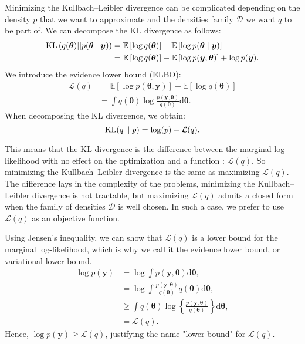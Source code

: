 \documentclass{article}
\numberwithin{equation}{section}
\DeclareMathOperator*{\KL}{{\rm KL}}
\begin{document}
Minimizing the Kullbach--Leibler divergence can be complicated depending on the density $p$ that we want to approximate and the densities family $\mathcal{D}$ we want $q$ to be part of. We can decompose the KL divergence as follows:
\begin{align*}
\KL\left(q(\boldsymbol{\theta})||p(\boldsymbol{\theta}\mid \boldsymbol{y})\right) &= \mathbb{E}\left[\log q(\boldsymbol{\theta})\right] - \mathbb{E}\left[\log p(\boldsymbol{\theta}\mid \boldsymbol{y})\right]\\
&= \mathbb{E}\left[\log q(\boldsymbol{\theta})\right] - \mathbb{E}\left[\log p(\boldsymbol{y},\boldsymbol{\theta})\right] + \log p(\boldsymbol{y}).
\end{align*}
We introduce the evidence lower bound (\small{ELBO}):
\begin{align*}
\mathcal{L}(q) &= \mathbb{E}\left[\log p(\boldsymbol{\theta},\boldsymbol{y})\right] - \mathbb{E}\left[\log q(\boldsymbol{\theta})\right]\\
&=\int q(\boldsymbol{\theta})\log\frac{p(\boldsymbol{y},\boldsymbol{\theta})}{q(\boldsymbol{\theta})}\mathrm{d}\boldsymbol{\theta}.
\end{align*}
When decomposing the KL divergence, we obtain:
\begin{equation*}
\KL(q\parallel p) = \log(p) - \mathcal{L}(q).
\end{equation*}

This means that the KL divergence is the difference between the marginal log-likelihood with no effect on the optimization and a function : $\mathcal{L}(q)$. So minimizing the Kullbach--Leibler divergence is the same as maximizing $\mathcal{L}(q)$. The difference lays in the complexity of the problems, minimizing the Kullbach--Leibler divergence is not tractable, but maximizing $\mathcal{L}(q)$ admits a closed form when the family of densities $\mathcal{D}$ is well chosen. In such a case, we prefer to use $\mathcal{L}(q)$ as an objective function.

Using Jensen's inequality, we can show that $\mathcal{L}(q)$ is a lower bound for the marginal log-likelihood, which is why we call it the evidence lower bound, or variational lower bound.
\begin{align*}
\log p(\boldsymbol{y}) &= \log \int p(\boldsymbol{y}, \boldsymbol{\theta}) \mathrm{d}\boldsymbol{\theta},\\
&= \log \int \frac{p(\boldsymbol{y}, \boldsymbol{\theta})}{q(\boldsymbol{\theta})}q(\boldsymbol{\theta})\mathrm{d}\boldsymbol{\theta}
,\\
&\geq \int q(\boldsymbol{\theta}) \log \left\lbrace \frac{p(\boldsymbol{y}, \boldsymbol{\theta})}{q(\boldsymbol{\theta})} \right\rbrace \mathrm{d}\boldsymbol{\theta},\\
&= \mathcal{L}(q).
\end{align*}
Hence, $\log p(\boldsymbol{y}) \geq \mathcal{L}(q)$, justifying the name "lower bound" for $\mathcal{L}(q)$.
\end{document}
